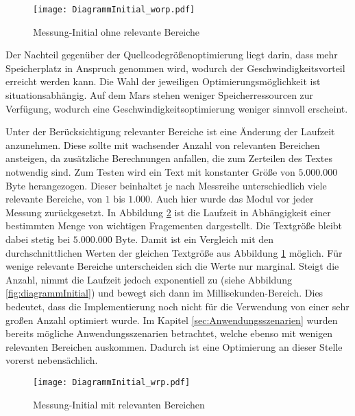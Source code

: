 \begin{figure}[H]
	\centering
	\texttt{[image: DiagrammInitial\_worp.pdf]}
	\label{fig:diagrammInitial_worp}
	\caption{Messung-Initial ohne relevante Bereiche}
\end{figure}

Der Nachteil gegenüber der Quellcodegrößenoptimierung liegt darin, dass
mehr Speicherplatz in Anspruch genommen wird, wodurch der
Geschwindigkeitsvorteil erreicht werden kann.
Die Wahl der jeweiligen Optimierungsmöglichkeit ist situationsabhängig. Auf dem
Mars stehen weniger Speicherressourcen zur Verfügung, wodurch eine
Geschwindigkeitsoptimierung weniger sinnvoll erscheint.

Unter der Berücksichtigung relevanter Bereiche ist eine Änderung der Laufzeit
anzunehmen. Diese sollte mit wachsender Anzahl von relevanten Bereichen
ansteigen, da zusätzliche Berechnungen anfallen, die zum Zerteilen des Textes
notwendig sind.
\newline
Zum Testen wird ein Text mit konstanter Größe von $5.000.000$ Byte
herangezogen. Dieser beinhaltet je nach Messreihe unterschiedlich viele
relevante Bereiche, von $1$ bis $1.000$. Auch hier wurde das Modul vor jeder
Messung zurückgesetzt.
\newline
In Abbildung \ref{fig:diagrammInitial_wrp} ist die Laufzeit in
Abhängigkeit einer bestimmten Menge von wichtigen Fragementen dargestellt.
Die Textgröße bleibt dabei stetig bei $5.000.000$ Byte. Damit ist ein Vergleich mit den
durchschnittlichen Werten der gleichen Textgröße aus Abbildung
\ref{fig:diagrammInitial_worp} möglich. Für wenige relevante Bereiche
unterscheiden sich die Werte nur marginal. Steigt die Anzahl, nimmt die Laufzeit
jedoch exponentiell zu (siehe Abbildung \ref{fig:diagrammInitial}) und bewegt
sich dann im Millisekunden-Bereich. Dies bedeutet, dass die Implementierung noch
nicht für die Verwendung von einer sehr großen Anzahl optimiert wurde. Im
Kapitel \ref{sec:Anwendungsszenarien} wurden bereits mögliche
Anwendungsszenarien betrachtet, welche ebenso mit wenigen relevanten Bereichen
auskommen. Dadurch ist eine Optimierung an dieser Stelle vorerst nebensächlich.

\begin{figure}[H]
	\centering
	\texttt{[image: DiagrammInitial\_wrp.pdf]}
	\label{fig:diagrammInitial_wrp}
	\caption{Messung-Initial mit relevanten Bereichen}
\end{figure}

